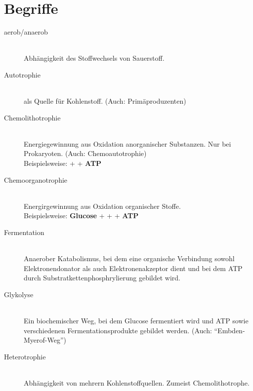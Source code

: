 \section{Begriffe}


\begin{description}
	\item[aerob/anaerob]\hfill \\
		Abhängigkeit des Stoffwechsels von Sauerstoff.

	\item[Autotrophie] \hfill \\
		 als Quelle für Kohlenstoff.
		(Auch: Primäproduzenten)

	\item[Chemolithotrophie]\hfill \\
		Energiegewinnung aus Oxidation anorganischer Substanzen.
		Nur bei Prokaryoten.
		(Auch: Chemoautotrophie)\\
		Beispielsweise: \textbf{} +  \textrightarrow  {} + \textbf{ATP}

	\item[Chemoorganotrophie]\hfill \\
		Energirgewinnung aus Oxidation organischer Stoffe.\\
		Beispielsweise: \textbf{Glucose} +  \textrightarrow  {} +  + \textbf{ATP}

	\item[Fermentation] \hfill \\
		Anaerober Katabolismus, bei dem eine organische Verbindung sowohl
		Elektronendonator als auch Elektronenakzeptor dient und bei dem
		ATP durch Substratkettenphosphrylierung gebildet wird.

	\item[Glykolyse] \hfill \\
		Ein biochemischer Weg,
		bei dem Glucose fermentiert wird und ATP sowie verschiedenen
		Fermentationsprodukte gebildet werden.
		(Auch: ``Embden-Myerof-Weg'')

	\item[Heterotrophie] \hfill \\
		Abhängigkeit von mehrern Kohlenstoffquellen.
		Zumeist Chemolithotrophe.


\end{description}
